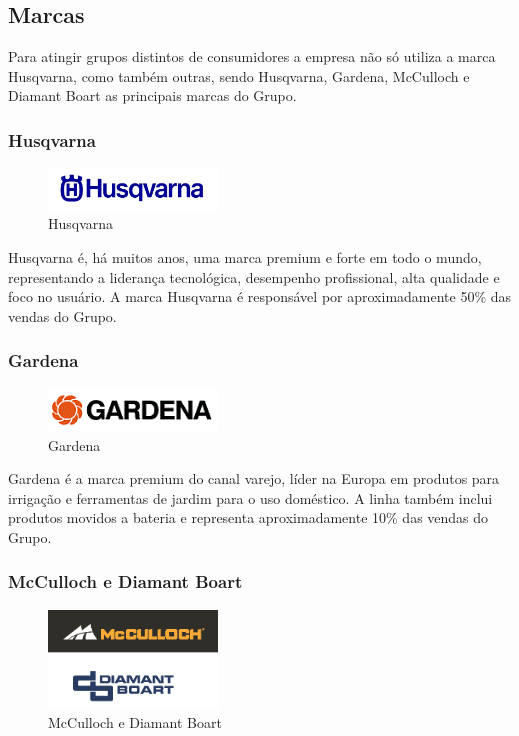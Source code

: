 \documentclass[12pt]{article}
\begin{document}
\subsection{Marcas}

	Para atingir grupos distintos de consumidores a empresa não só utiliza a marca Husqvarna, como também outras, sendo Husqvarna, Gardena, McCulloch e Diamant Boart as principais marcas do Grupo.

\subsubsection{Husqvarna}

\begin{figure}[h!]
	\centering
	\includegraphics[width=0.4\textwidth]{img/logo-husqvarna.png}
	\caption{Husqvarna}
\end{figure}

	Husqvarna é, há muitos anos, uma marca premium e forte em todo o mundo, representando a liderança tecnológica, desempenho profissional, alta qualidade e foco no usuário. A marca Husqvarna é responsável por aproximadamente 50\% das vendas do Grupo.

\subsubsection{Gardena}

\begin{figure}[h!]
	\centering
	\includegraphics[width=0.4\textwidth]{img/logo-gardena.png}
	\caption{Gardena}
\end{figure}

	Gardena é a marca premium do canal varejo, líder na Europa em produtos para irrigação e ferramentas de jardim para o uso doméstico. A linha também inclui produtos movidos a bateria e representa aproximadamente 10\% das vendas do Grupo.

\subsubsection{McCulloch e Diamant Boart}

\begin{figure}[h!]
	\centering
	\includegraphics[width=0.4\textwidth]{img/logo-mcdb.png}
	\caption{McCulloch e Diamant Boart}
\end{figure}
\end{document}
